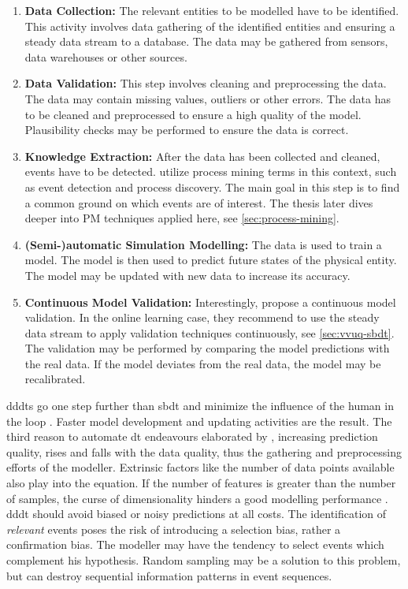 \begin{enumerate}
  \item \textbf{Data Collection:} The relevant entities to be modelled have to be identified. This activity involves data gathering of the identified entities and ensuring a steady data stream to a database. The data may be gathered from sensors, data warehouses or other sources.
  \item \textbf{Data Validation:} This step involves cleaning and preprocessing the data. The data may contain missing values, outliers or other errors. The data has to be cleaned and preprocessed to ensure a high quality of the model. Plausibility checks may be performed to ensure the data is correct.
  \item \textbf{Knowledge Extraction:} After the data has been collected and cleaned, events have to be detected.  utilize process mining terms in this context, such as event detection and process discovery. The main goal in this step is to find a common ground on which events are of interest. The thesis later dives deeper into PM techniques applied here, see \autoref{sec:process-mining}.
  \item \textbf{(Semi-)automatic Simulation Modelling:} The data is used to train a model. The model is then used to predict future states of the physical entity. The model may be updated with new data to increase its accuracy.
  \item \textbf{Continuous Model Validation:} Interestingly, \citeauthor{francis2021towards} propose a continuous model validation. In the online learning case, they recommend to use the steady data stream to apply validation techniques continuously, see \autoref{sec:vvuq-sbdt}. The validation may be performed by comparing the model predictions with the real data. If the model deviates from the real data, the model may be recalibrated.
\end{enumerate}

\gls{dddt}s go one step further than \gls{sbdt} and minimize the influence of the human in the loop \autocite{francis2021towards,Friederich2022}. Faster model development and updating activities are the result. The third reason to automate \gls{dt} endeavours elaborated by \textcite{schwede2024learning}, increasing prediction quality, rises and falls with the data quality, thus the gathering and preprocessing efforts of the modeller. Extrinsic factors like the number of data points available also play into the equation. If the number of features is greater than the number of samples, the curse of dimensionality hinders a good modelling performance \autocite{koppen2000curse}. \gls{dddt} should avoid biased or noisy predictions at all costs. The identification of \textit{relevant} events poses the risk of introducing a selection bias, rather a confirmation bias. The modeller may have the tendency to select events which complement his hypothesis. Random sampling may be a solution to this problem, but can destroy sequential information patterns in event sequences.


